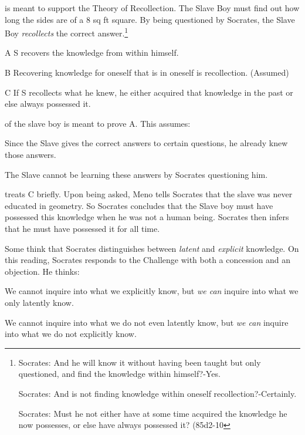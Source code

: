 \documentclass{tufte-handout}
\begin{document}
 is meant to support the Theory of Recollection. The Slave Boy must find out how long the sides are of a 8 sq ft square. By being questioned by Socrates, the Slave Boy \emph{recollects} the correct answer.\footnote{\small{Socrates: And he will know it without having been taught but only questioned, and find the knowledge within himself?-Yes.

Socrates: And is not finding knowledge within oneself recollection?-Certainly.

Socrates: Must he not either have at some time acquired the knowledge he now possesses, or else have always possessed it? (85d2-10}}

\begin{enumerate*}
\item[A] S recovers the knowledge from within himself.
\item[B] Recovering knowledge for oneself that is in oneself is recollection. (Assumed)
\item[C] If S recollects what he knew, he either acquired that knowledge in the past or else always possessed it. 
\end{enumerate*} 

 of the slave boy is meant to prove A. This assumes:
\begin{enumerate*}
\item Since the Slave gives the correct answers to certain questions, he already knew those answers. 
\item The Slave cannot be learning these answers by Socrates questioning him. 
\end{enumerate*}

\begin{fullwidth}
 treats C briefly. Upon being asked, Meno tells Socrates that the slave was never educated in geometry. So Socrates concludes that the Slave boy must have possessed this knowledge when he was not a human being. Socrates then infers that he must have possessed it for all time. 

 Some think that Socrates distinguishes between \emph{latent} and \emph{explicit} knowledge. On this reading, Socrates responds to the Challenge with both a concession and an objection. He thinks:
\begin{enumerate*}
\item We cannot inquire into what we explicitly know, but \emph{we can} inquire into what we only latently know. 
\item We cannot inquire into what we do not even latently know, but \emph{we can} inquire into what we do not explicitly know.
\end{enumerate*}
\end{fullwidth}
\end{document}

